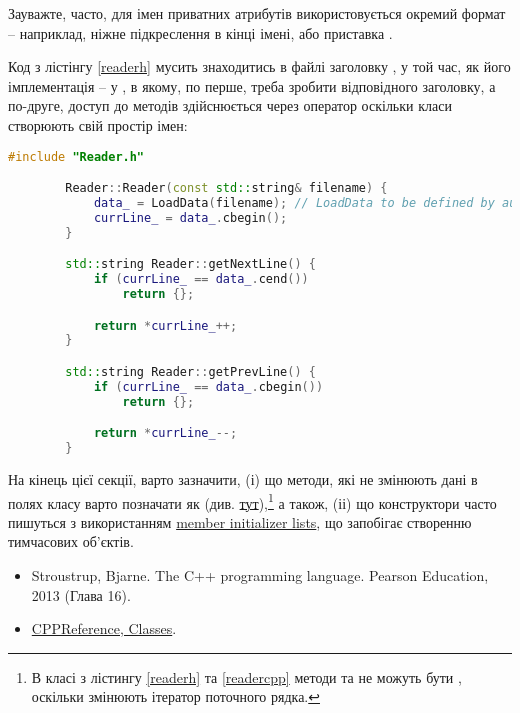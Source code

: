 \documentclass[12pt]{article}
\begin{document}
	Зауважте, часто, для імен приватних атрибутів використовується окремий формат -- наприклад, ніжне підкреслення в кінці імені, або приставка .

	Код з лістінгу \ref{readerh} мусить знаходитись в файлі заголовку , у той час, як його імплементація -- у , в якому, по перше, треба зробити  відповідного заголовку, а по-друге, доступ до методів здійснюється через оператор \m{::} оскільки класи створюють свій простір імен:
	\begin{lstlisting}[language=c++,label=readercpp,caption="Reader.cpp"]
		#include "Reader.h"

		Reader::Reader(const std::string& filename) {
			data_ = LoadData(filename); // LoadData to be defined by author
			currLine_ = data_.cbegin();
		}

		std::string Reader::getNextLine() {
			if (currLine_ == data_.cend())
				return {};

			return *currLine_++;
		}

		std::string Reader::getPrevLine() {
			if (currLine_ == data_.cbegin())
				return {};

			return *currLine_--;
		}

	\end{lstlisting}

	На кінець цієї секції, варто зазначити, (і) що методи, які не змінюють дані в полях класу варто позначати як  (див. \href{https://en.cppreference.com/w/cpp/language/member_functions#const-_and_volatile-qualified_member_functions}{тут}),\footnote{В класі  з лістингу \ref{readerh} та \ref{readercpp} методи  та  не можуть бути , оскільки змінюють ітератор поточного рядка.} а також, (іі) що конструктори часто пишуться з використанням \href{https://en.cppreference.com/w/cpp/language/constructor}{member initializer lists}, що запобігає створенню тимчасових об'єктів.


	
	\begin{itemize}
		\item Stroustrup, Bjarne. The C++ programming language. Pearson Education, 2013 (Глава 16).
		\item \href{https://en.cppreference.com/w/cpp/language/classes}{CPPReference, Classes}.
	\end{itemize}
\end{document}
